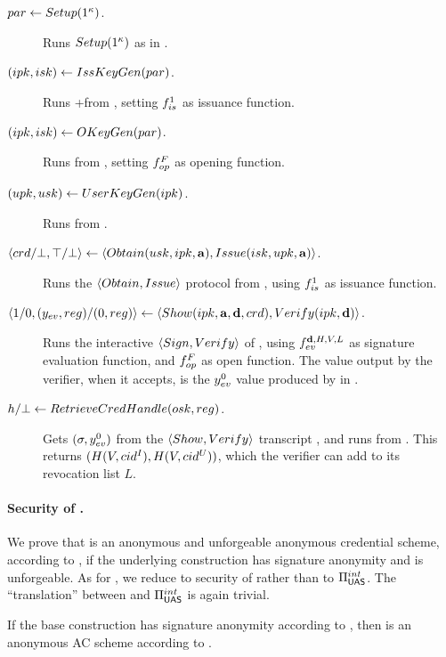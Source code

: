 \begin{description}
\item[$par \gets Setup(1^\kappa)$.] Runs $Setup(1^\kappa)$ as in
  \CUASGenInt.
\item[$(ipk,isk) \gets IssKeyGen(par)$.] Runs \KeyGen+\ISet from
  \CUASGenInt, setting $f_{is}^1$ as issuance function.
\item[$(ipk,isk) \gets OKeyGen(par)$.] Runs \OKeyGen from \CUASGenInt,
  setting $f_{op}^F$ as opening function.
\item[$(upk,usk) \gets UserKeyGen(ipk)$.] Runs \KeyGen from \CUASGenInt.
\item[$\langle crd/\bot,\top/\bot \rangle \gets
  \langle Obtain(usk,ipk,\mathbf{a}),Issue(isk,upk,\mathbf{a}) \rangle$.]
  Runs the $\langle Obtain,Issue \rangle$ protocol from \CUASGenInt, using
  $f_{is}^1$ as issuance function.
\item[$\langle 1/0,(y_{ev},reg)/(0,reg)\rangle \gets \langle Show(ipk,
  \mathbf{a},\mathbf{d},crd),
  Verify(ipk,\mathbf{d}) \rangle$.]
  Runs the interactive $\langle Sign,Verify\rangle$ of \CUASGenInt,
  using $f_{ev}^{\mathbf{d},H,V,L}$ as signature evaluation function, and
  $f_{op}^F$ as open function. The \yeval value output by the verifier, when
  it accepts, is the $y_{ev}^0$ value produced by \Sign in \CUASGenInt.
\item[$h/\bot \gets RetrieveCredHandle(osk,reg)$.]
  Gets $(\sigma,y_{ev}^0)$ from the $\langle Show,Verify\rangle$ transcript
  \utrans, and runs \Open from \CUASGenInt. This returns $(H(V,cid^I),
  H(V,cid^U))$, which the verifier can add to its revocation list $L$.
\end{description}

\paragraph{Security of \CUASRAC.} %
We prove that \CUASRAC is an anonymous and unforgeable anonymous credential
scheme, according to \cite{fhs19}, if the underlying \CUASGen construction
has signature anonymity and is unforgeable.
%
As for \CUASAC, we reduce to security of \CUASGen rather than to
$\Pi_{\mathsf{UAS}}^{int}$. The ``translation'' between \CUASGen and $\Pi_{\mathsf{UAS}}^{int}$ is
again trivial.

\begin{theorem}
  \label{thm:anon-cuasrac}
  If the base \CUASGen construction has signature anonymity according to
  , then \CUASAC is an anonymous AC scheme
  according to \cite{fhs19}.
\end{theorem}

